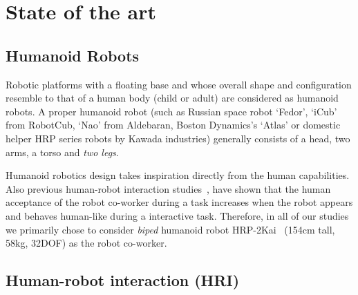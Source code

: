 
{\color{blue}\chapter{State of the art}\label{sota}}

\section{Humanoid Robots}

Robotic platforms with a floating base and whose overall shape and configuration resemble to that of a human body (child or adult) are considered as humanoid robots. A proper humanoid robot (such as Russian space robot `Fedor', `iCub' from RobotCub, `Nao' from Aldebaran, Boston Dynamics's `Atlas' or domestic helper HRP series robots by Kawada industries) generally consists of a head, two arms, a torso and \textit{two legs}.

Humanoid robotics design takes inspiration directly from the human capabilities. Also previous human-robot interaction studies~\cite{huber2008human, strabala2013toward, shibata1995experimental, Chaminade:JPP:2009}, have shown that the human acceptance of the robot co-worker during a task increases when the robot appears and behaves human-like during a interactive task. Therefore, in all of our studies we primarily chose to consider \textit{biped} humanoid robot HRP-2Kai~\cite{Kaneko:RAS_ICHR:2015} (154cm tall, 58kg, 32DOF) as the robot co-worker.
	


\clearpage

\section{Human-robot interaction (HRI)}

